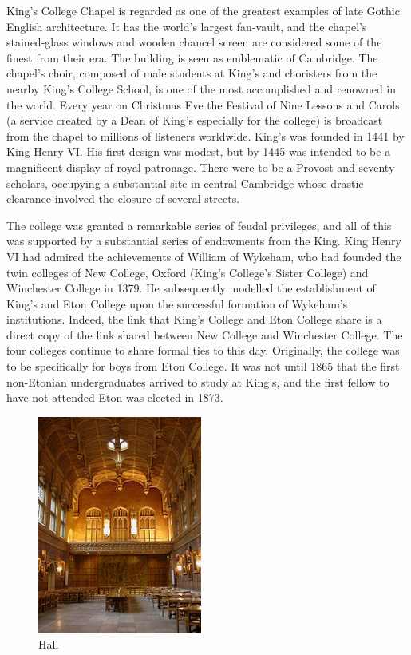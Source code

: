 \documentclass{report}
\begin{document}
King's College Chapel is regarded as one of the greatest examples of late Gothic English architecture. It has the world's largest fan-vault, and the chapel's stained-glass windows and wooden chancel screen are considered some of the finest from their era. The building is seen as emblematic of Cambridge. The chapel's choir, composed of male students at King's and choristers from the nearby King's College School, is one of the most accomplished and renowned in the world. Every year on Christmas Eve the Festival of Nine Lessons and Carols (a service created by a Dean of King's especially for the college) is broadcast from the chapel to millions of listeners worldwide. King's was founded in 1441 by King Henry VI. His first design was modest, but by 1445 was intended to be a magnificent display of royal patronage. There were to be a Provost and seventy scholars, occupying a substantial site in central Cambridge whose drastic clearance involved the closure of several streets. 

The college was granted a remarkable series of feudal privileges, and all of this was supported by a substantial series of endowments from the King. King Henry VI had admired the achievements of William of Wykeham, who had founded the twin colleges of New College, Oxford (King's College's Sister College) and Winchester College in 1379. He subsequently modelled the establishment of King's and Eton College upon the successful formation of Wykeham's institutions. Indeed, the link that King's College and Eton College share is a direct copy of the link shared between New College and Winchester College. The four colleges continue to share formal ties to this day. Originally, the college was to be specifically for boys from Eton College. It was not until 1865 that the first non-Etonian undergraduates arrived to study at King's, and the first fellow to have not attended Eton was elected in 1873. \\

\begin{figure}
\vspace{-10mm} %
  \begin{center}
    \includegraphics[width=0.48\textwidth]{Pictures/dining.jpg}
  \end{center}
  \caption{Hall}
\end{figure}
\end{document}
